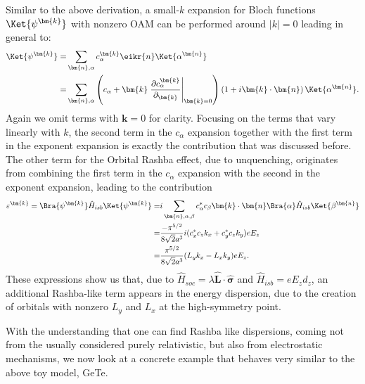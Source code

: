 Similar to the above derivation, a small-$k$ expansion for Bloch functions $\Ket{\psi^{\bm{k}}}$ with nonzero OAM can be performed around $|k|=0$ leading in general to:
\begin{align}
	\Ket{\psi^{\bm{k}}} =& \sum_{\bm{n},\alpha} c_\alpha^{\bm{k}} \eikr{n} \Ket{\alpha^{\bm{n}}}\\
	=& \sum_{\bm{n},\alpha} \left(c_\alpha + \bm{k}\left.\frac{\partial c_\alpha^{\bm{k}}}{\partial_{\bm{k}}}\right\rvert_{\bm{k}=0} \right)\left(1 + i\bm{k}\cdot\bm{n}\right)\Ket{\alpha^{\bm{n}}}.
\end{align}
Again we omit terms with $\bm{k}=0$ for clarity.
Focusing on the terms that vary linearly with $k$, the second term in the $c_{\alpha}$ expansion together with the first term in the exponent expansion is exactly the contribution that was discussed before.
The other term for the Orbital Rashba effect, due to unquenching, originates from combining the first term in the $c_\alpha$ expansion with the second in the exponent expansion, leading to the contribution
\begin{align}
	\label{eq:d_z_from_OAM}
	\varepsilon^{\bm{k}} = \Bra{\psi^{\bm{k}}} \hat{H}_{isb} \Ket{\psi^{\bm{k}}} =&  i\sum_{\bm{n},\alpha,\beta} c_\alpha^* c_\beta \bm{k}\cdot\bm{n}\Bra{\alpha} \hat{H}_{isb} \Ket{\beta^{\bm{n}}}\\
	=&\frac{-\pi^{5/2}}{8\sqrt{2}a^3}i(c^*_xc_zk_x + c^*_yc_z k_y) e E_z  \\
	=&\frac{\pi^{5/2}}{8\sqrt{2}a^3}(L_y k_x - L_x k_y) e E_z.
\end{align}
These expressions show us that, due to ${\hat{H}_{soc} = \lambda \hat{\bm{L}}\cdot\hat{\bm{\sigma}}}$ and $\hat{H}_{isb} = e E_z d_z$, an additional Rashba-like term appears in the energy dispersion, due to the creation of orbitals with nonzero $L_y$ and $L_x$ at the high-symmetry point.

With the understanding that one can find Rashba like dispersions, coming not from the usually considered purely relativistic, but also from electrostatic mechanisms, we now look at a concrete example that behaves very similar to the above toy model, GeTe.

